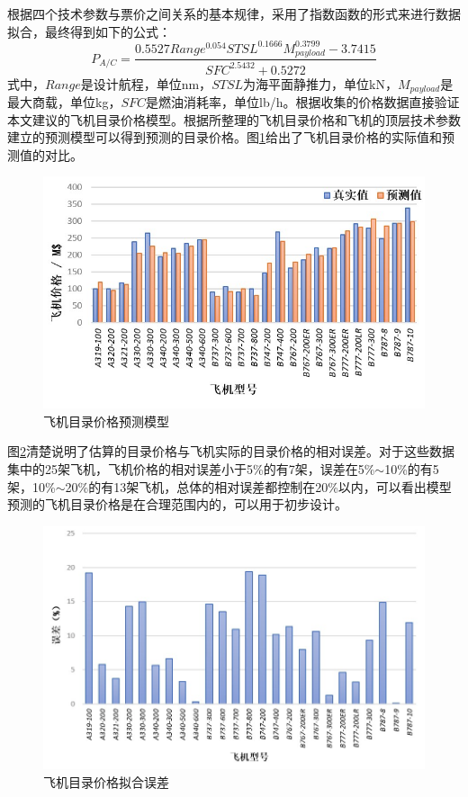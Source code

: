 \documentclass[12pt,a4paper]{report}
\begin{document}
根据四个技术参数与票价之间关系的基本规律，采用了指数函数的形式来进行数据拟合，最终得到如下的公式：
\begin{equation}
\label{equa:aircraftprice}
P_{A/C}=\frac{0.5527Range^{0.054}STSL^{0.1666}M_{payload}^{0.3799}-3.7415}{SFC^{2.5432}+0.5272}
\end{equation}
式中，$Range$是设计航程，单位nm，$STSL$为海平面静推力，单位kN，$M_{payload}$是最大商载，单位kg，$SFC$是燃油消耗率，单位lb/h。根据收集的价格数据直接验证本文建议的飞机目录价格模型。根据所整理的飞机目录价格和飞机的顶层技术参数建立的预测模型可以得到预测的目录价格。图\ref{fig:listprice}给出了飞机目录价格的实际值和预测值的对比。
\begin{figure}[htp]
  \centering
  \includegraphics[width=.9\textwidth]{eps/aircraftpricemodel.jpg}
  \caption{飞机目录价格预测模型}
 \label{fig:listprice}
\end{figure}

图\ref{fig:aircraftprice}清楚说明了估算的目录价格与飞机实际的目录价格的相对误差。对于这些数据集中的25架飞机，飞机价格的相对误差小于5\%的有7架，误差在5\%$\sim$10\%的有5架，10\%$\sim$20\%的有13架飞机，总体的相对误差都控制在20\%以内，可以看出模型预测的飞机目录价格是在合理范围内的，可以用于初步设计。
\begin{figure}[htp]
  \centering
  \includegraphics[width=.9\textwidth]{eps/aircraftprice.jpg}
  \caption{飞机目录价格拟合误差}
 \label{fig:aircraftprice}
\end{figure}
\end{document}
